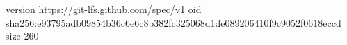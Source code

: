 version https://git-lfs.github.com/spec/v1
oid sha256:e93795adb09854b36c6e6c8b382fc325068d1de089206410f9c9052f0618eccd
size 260
